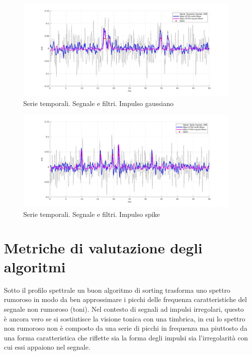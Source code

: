 \documentclass[9pt,twocolumn,twoside]{osajnl}
\begin{document}
\begin{figure}[htbp]
\centering
\includegraphics[width=1\linewidth]{results/c1_I2SNR0time.jpg}
\caption{Serie temporali. Segnale e filtri. Impulso gaussiano}
\label{fig:c1_I2SNR0time}
\end{figure}

\begin{figure}[htbp]
\centering
\includegraphics[width=1\linewidth]{results/c1_I4SNR0time.jpg}
\caption{Serie temporali. Segnale e filtri. Impulso spike}
\label{fig:c1_I4SNR0time}
\end{figure}




\section{Metriche di valutazione degli algoritmi}

Sotto il profilo spettrale un buon algoritmo di sorting trasforma uno spettro rumoroso in modo da ben approssimare i picchi delle frequenza caratteristiche del segnale non rumoroso (toni). Nel contesto di segnali ad impulsi irregolari, questo è ancora vero se si sostiutisce la visione tonica con una timbrica, in cui lo spettro non rumoroso non è composto da una serie di picchi in frequenza ma piuttosto da una forma caratteristica che riflette sia la forma degli impulsi sia l'irregolarità con cui essi appaiono nel segnale.
\end{document}
